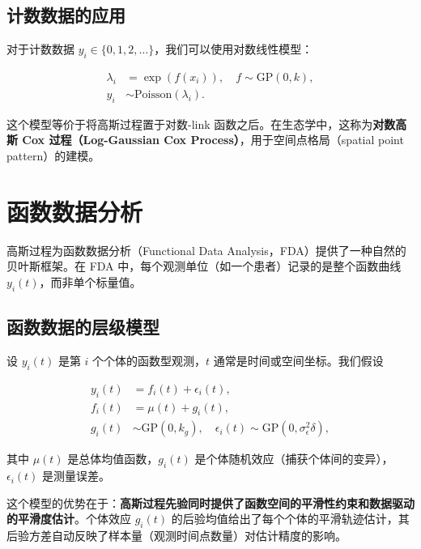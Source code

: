 \subsection{计数数据的应用}

对于计数数据 $y_i \in \{0, 1, 2, \ldots\}$，我们可以使用对数线性模型：

\begin{align}
\lambda_i &= \exp(f(x_i)), \quad f \sim \mathrm{GP}(0, k), \label{eq:gp-poisson-link} \\
y_i &\sim \mathrm{Poisson}(\lambda_i). \label{eq:gp-poisson-likelihood}
\end{align}

这个模型等价于将高斯过程置于对数-link 函数之后。在生态学中，这称为\textbf{对数高斯 Cox 过程（Log-Gaussian Cox Process）}，用于空间点格局（spatial point pattern）的建模。

\section{函数数据分析}\label{sec:functional-data-analysis}

高斯过程为函数数据分析（Functional Data Analysis，FDA）提供了一种自然的贝叶斯框架。在 FDA 中，每个观测单位（如一个患者）记录的是整个函数曲线 $y_i(t)$，而非单个标量值。

\subsection{函数数据的层级模型}

设 $y_i(t)$ 是第 $i$ 个个体的函数型观测，$t$ 通常是时间或空间坐标。我们假设

\begin{align}
y_i(t) &= f_i(t) + \epsilon_i(t), \label{eq:fda-observation} \\
f_i(t) &= \mu(t) + g_i(t), \label{eq:fda-mean-decomposition} \\
g_i(t) &\sim \mathrm{GP}(0, k_g), \quad \epsilon_i(t) \sim \mathrm{GP}(0, \sigma_\epsilon^2 \delta), \label{eq:fda-gp-prior}
\end{align}

其中 $\mu(t)$ 是总体均值函数，$g_i(t)$ 是个体随机效应（捕获个体间的变异），$\epsilon_i(t)$ 是测量误差。

这个模型的优势在于：\textbf{高斯过程先验同时提供了函数空间的平滑性约束和数据驱动的平滑度估计}。个体效应 $g_i(t)$ 的后验均值给出了每个个体的平滑轨迹估计，其后验方差自动反映了样本量（观测时间点数量）对估计精度的影响。


